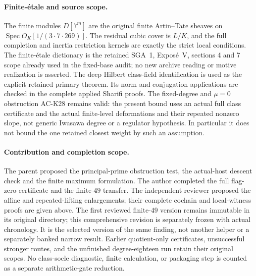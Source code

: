 \paragraph{Finite-\'etale and source scope.}
The finite modules $D[7^m]$ are the original finite Artin--Tate
sheaves on $\operatorname{Spec}O_K[1/(3\cdot7\cdot269)]$.
The residual cubic cover is $L/K$, and the full completion and
inertia restriction kernels are exactly the strict local conditions.
The finite-\'etale dictionary is the retained SGA~1, Expos\'e~V,
sections 4 and 7 scope already used in the fixed-base audit; no new
archive reading or motive realization is asserted.
The deep Hilbert class-field identification is used as the explicit
retained primary theorem.  Its norm and conjugation applications
are checked in the complete applied Sharifi proofs.
The fixed-degree and $\mu=0$ obstruction AC-K28 remains valid:
the present bound uses an actual full class certificate and the
actual finite-level deformations and their repeated nonzero slope,
not generic Iwasawa degree or a regulator hypothesis.
In particular it does not bound the one
retained closest weight by such an assumption.

\paragraph{Contribution and completion scope.}
The parent proposed the principal-prime obstruction test, the
actual-host descent check and the finite maximum formulation.
The author completed the full flag-zero
certificate and the finite-$49$ transfer.  The independent reviewer
proposed the affine and repeated-lifting enlargements; their complete
cochain and local-witness proofs are given above.  The first reviewed
finite-$49$ version remains immutable in its original directory; this
comprehensive revision is separately frozen with actual chronology.
It is the selected version of the same finding, not another helper or
a separately banked narrow result.  Earlier quotient-only certificates,
unsuccessful stronger
routes, and the unfinished degree-eighteen run retain their original
scopes.  No class-socle diagnostic, finite calculation, or packaging
step is counted as a separate arithmetic-gate reduction.
